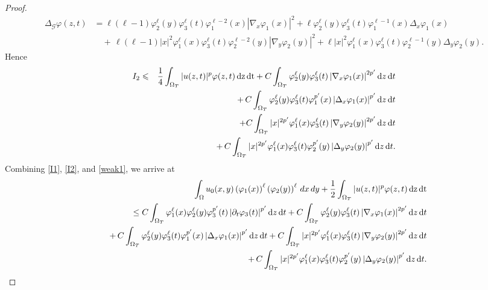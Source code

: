 \documentclass[reqno,11pt]{amsart}
\numberwithin{equation}{section}
\begin{document}
\begin{proof}
\begin{align}
		\Delta_{\mathcal{G}}\varphi(z,t) &=\ell(\ell-1)\varphi^\ell_2(y)\varphi^\ell_3(t)\varphi^{\ell-2}_1(x)|\nabla_x\varphi_1(x)|^2+\ell\varphi^\ell_2(y)\varphi^\ell_3(t)\varphi^{\ell-1}_1(x)\Delta_x\varphi_1(x) \\
		&{}\quad +\,\ell(\ell-1)|x|^2\varphi^\ell_1(x)\varphi^\ell_3(t)\varphi^{\ell-2}_2(y)|\nabla_y\varphi_2(y)|^2+\ell|x|^2\varphi^\ell_1(x)\varphi^\ell_3(t)\varphi^{\ell-1}_2(y)\Delta_y\varphi_2(y) .\nonumber
	\end{align}
	Hence
	\begin{eqnarray}\label{I2}
		I_2&\leqslant&\frac{1}{4} \int_{\Omega_T}|u(z,t)|^{p}\varphi(z,t)\,\mathrm{dz}\,\mathrm{dt}+C\int_{\Omega_T}\varphi_2^\ell(y)\varphi_3^\ell(t)\left|\nabla_x \varphi_1(x)\right|^{2p'}\mathrm{d}z\,\mathrm{d}t\notag\\
		&{}&+\,C\int_{\Omega_T}\varphi_2^\ell(y)\varphi_3^\ell(t)\varphi_1^{p'}(x)\left|\Delta_x \varphi_1(x)\right|^{p'}\mathrm{d}z\,\mathrm{d}t\notag \\
		&{}&+C\int_{\Omega_T}|x|^{2p'}\varphi_1^\ell(x)\varphi_3^\ell(t)\left|\nabla_y \varphi_2(y)\right|^{2p'}\mathrm{d}z\,\mathrm{d}t\notag\\
		&{}&+\,C\int_{\Omega_T}|x|^{2p'}\varphi_1^\ell(x)\varphi_3^\ell(t)\varphi_2^{p'}(y)\left|\Delta_y \varphi_2(y)\right|^{p'}\mathrm{d}z\,\mathrm{d}t .
	\end{eqnarray}
	Combining \eqref{I1}, \eqref{I2}, and \eqref{weak1}, we arrive at
	\begin{eqnarray}\label{weak2}
		&{}&\int_{\Omega}u_0(x,y)\left(\varphi_1(x)\right)^\ell \left(\varphi_2(y)\right)^\ell\,dx\,dy+\frac{1}{2}\int_{\Omega_T}|u(z,t)|^{p}\varphi(z,t)\,\mathrm{dz}\,\mathrm{dt}\notag\\
		&{}&\leq C\int_{\Omega_T}\varphi_1^\ell(x)\varphi_2^\ell(y)\varphi_3^{p^\prime}(t)\left|\partial_t \varphi_3(t)\right|^{p'}\mathrm{d}z\,\mathrm{d}t+C\int_{\Omega_T}\varphi_2^\ell(y)\varphi_3^\ell(t)\left|\nabla_x \varphi_1(x)\right|^{2p'}\mathrm{d}z\,\mathrm{d}t\notag\\
		&{}&+\,C\int_{\Omega_T}\varphi_2^\ell(y)\varphi_3^\ell(t)\varphi_1^{p'}(x)\left|\Delta_x \varphi_1(x)\right|^{p'}\mathrm{d}z\,\mathrm{d}t+C\int_{\Omega_T}|x|^{2p'}\varphi_1^\ell(x)\varphi_3^\ell(t)\left|\nabla_y \varphi_2(y)\right|^{2p'}\mathrm{d}z\,\mathrm{d}t\notag\\
		&{}&+\,C\int_{\Omega_T}|x|^{2p'}\varphi_1^\ell(x)\varphi_3^\ell(t)\varphi_2^{p'}(y)\left|\Delta_y \varphi_2(y)\right|^{p'}\mathrm{d}z\,\mathrm{d}t .
	\end{eqnarray}

\end{proof}
\end{document}
